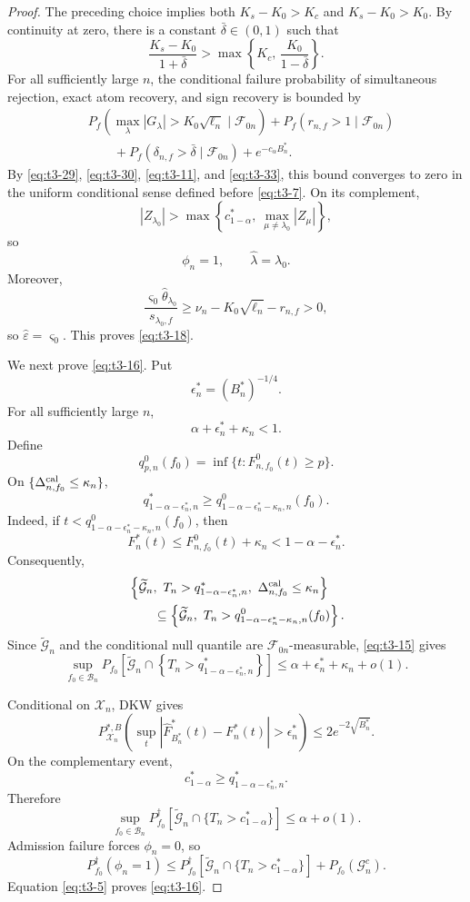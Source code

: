 \documentclass[11pt]{article}
\theoremstyle{definition}
\newcommand{\1}{\mathbf 1}\newcommand{\op}{\operatorname}
\begin{document}
\begin{proof}
The preceding choice implies both
\(K_s-K_0>K_c\) and \(K_s-K_0>K_0\).
By continuity at zero, there is a constant
\(\bar\delta\in(0,1)\) such that
\[
\frac{K_s-K_0}{1+\bar\delta}
>
\max\left\{
K_c,\,
\frac{K_0}{1-\bar\delta}
\right\}.
\]
For all sufficiently large \(n\), the conditional failure probability
of simultaneous rejection, exact atom recovery, and sign recovery is
bounded by
\begin{align*}
&
P_f\left(
\max_\lambda|G_\lambda|>K_0\sqrt{\ell_n}
\mid\mathcal F_{0n}
\right)
+
P_f(r_{n,f}>1\mid\mathcal F_{0n})\\
&\qquad
+
P_f(\delta_{n,f}>\bar\delta\mid\mathcal F_{0n})
+
e^{-c_\alpha B_n^*}.
\end{align*}
By \eqref{eq:t3-29}, \eqref{eq:t3-30}, \eqref{eq:t3-11}, and
\eqref{eq:t3-33}, this bound converges to zero in the uniform
conditional sense defined before \eqref{eq:t3-7}.  On its complement,
\[
|Z_{\lambda_0}|
>
\max\left\{
c_{1-\alpha}^*,\
\max_{\mu\ne\lambda_0}|Z_\mu|
\right\},
\]
so
\[
\phi_n=1,
\qquad
\widehat\lambda=\lambda_0.
\]
Moreover,
\[
\frac{
\varsigma_0\widehat\theta_{\lambda_0}
}{
s_{\lambda_0,f}
}
\ge
\nu_n-K_0\sqrt{\ell_n}-r_{n,f}>0,
\]
so \(\widehat\varepsilon=\varsigma_0\).  This proves
\eqref{eq:t3-18}.

We next prove \eqref{eq:t3-16}.  Put
\[
\epsilon_n^*=(B_n^*)^{-1/4}.
\]
For all sufficiently large \(n\),
\[
\alpha+\epsilon_n^*+\kappa_n<1.
\]
Define
\[
q_{p,n}^{0}(f_0)
=
\inf\{t:F_{n,f_0}^{0}(t)\ge p\}.
\]
On
\(\{\Delta_{n,f_0}^{\rm cal}\le\kappa_n\}\),
\[
q_{1-\alpha-\epsilon_n^*,n}^*
\ge
q_{1-\alpha-\epsilon_n^*-\kappa_n,n}^{0}(f_0).
\]
Indeed, if
\(t<q_{1-\alpha-\epsilon_n^*-\kappa_n,n}^{0}(f_0)\), then
\[
F_n^*(t)
\le
F_{n,f_0}^{0}(t)+\kappa_n
<
1-\alpha-\epsilon_n^*.
\]
Consequently,
\begin{align*}
&
\left\{
\widetilde{\mathcal G}_n,\
T_n>q_{1-\alpha-\epsilon_n^*,n}^*,\
\Delta_{n,f_0}^{\rm cal}\le\kappa_n
\right\}\\
&\qquad\subseteq
\left\{
\widetilde{\mathcal G}_n,\
T_n>
q_{1-\alpha-\epsilon_n^*-\kappa_n,n}^{0}(f_0)
\right\}.
\end{align*}
Since \(\widetilde{\mathcal G}_n\) and the conditional null quantile
are \(\mathcal F_{0n}\)-measurable, \eqref{eq:t3-15} gives
\[
\sup_{f_0\in\mathcal B_n}
P_{f_0}\left[
\widetilde{\mathcal G}_n
\cap
\left\{
T_n>
q_{1-\alpha-\epsilon_n^*,n}^*
\right\}
\right]
\le
\alpha+\epsilon_n^*+\kappa_n+o(1).
\]

Conditional on \(\mathcal X_n\), DKW gives
\[
P_{\mathcal X_n}^{*,B}\left(
\sup_t
|\widehat F_{B_n^*}^*(t)-F_n^*(t)|
>
\epsilon_n^*
\right)
\le
2e^{-2\sqrt{B_n^*}}.
\]
On the complementary event,
\[
c_{1-\alpha}^*
\ge
q_{1-\alpha-\epsilon_n^*,n}^*.
\]
Therefore
\[
\sup_{f_0\in\mathcal B_n}
P_{f_0}^\dagger\left[
\widetilde{\mathcal G}_n
\cap
\{T_n>c_{1-\alpha}^*\}
\right]
\le
\alpha+o(1).
\]
Admission failure forces \(\phi_n=0\), so
\[
P_{f_0}^\dagger(\phi_n=1)
\le
P_{f_0}^\dagger\left[
\widetilde{\mathcal G}_n
\cap
\{T_n>c_{1-\alpha}^*\}
\right]
+
P_{f_0}(\mathcal G_n^c).
\]
Equation \eqref{eq:t3-5} proves \eqref{eq:t3-16}.


\end{proof}
\end{document}
